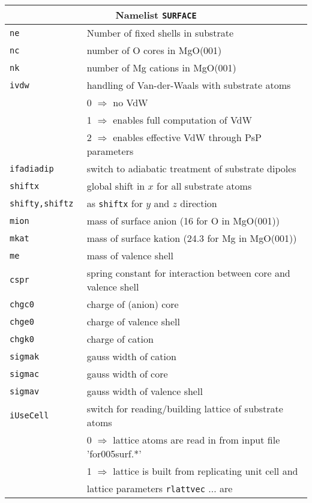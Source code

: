 \documentclass[12pt]{article}
\begin{document}
\begin{tabular}{ll}
\hline
\multicolumn{2}{c}{Namelist {\tt SURFACE}} in {\tt for005.<name>} \\
\hline
{\tt ne               }& Number of fixed shells in substrate\\
{\tt nc               }& number of O cores in MgO(001)\\
{\tt nk               }& number of Mg cations in MgO(001)\\
{\tt ivdw} & handling of Van-der-Waals with substrate atoms\\
    & 0 $\Longrightarrow$ no VdW\\
    & 1 $\Longrightarrow$ enables full computation of VdW\\
    & 2 $\Longrightarrow$ enables effective VdW through PsP parameters\\
{\tt ifadiadip        }& switch to adiabatic treatment of substrate dipoles\\
{\tt shiftx           }& global shift in $x$ for all substrate atoms\\
{\tt shifty,shiftz    }& as {\tt shiftx} for $y$ and $z$ direction\\
{\tt mion             }& mass of surface anion (16 for O in MgO(001))\\
{\tt mkat             }& mass of surface kation (24.3 for Mg in MgO(001))\\
{\tt me               }& mass of valence shell\\
{\tt cspr             }& spring constant for interaction between core and valence shell\\
{\tt chgc0            }& charge of (anion) core\\
{\tt chge0            }& charge of valence shell\\
{\tt chgk0            }& charge of cation\\
{\tt sigmak           }& gauss width of cation\\
{\tt sigmac           }& gauss width of core\\
{\tt sigmav           }& gauss width of valence shell\\
{\tt iUseCell         }& switch for reading/building lattice of
                          substrate atoms\\
   & 0 $\Longrightarrow$ lattice atoms are read in from input file 'for005surf.*'\\
   & 1 $\Longrightarrow$ lattice is built from replicating unit cell and\\
   &\qquad lattice parameters {\tt rlattvec} ... are

\end{tabular}
\end{document}
